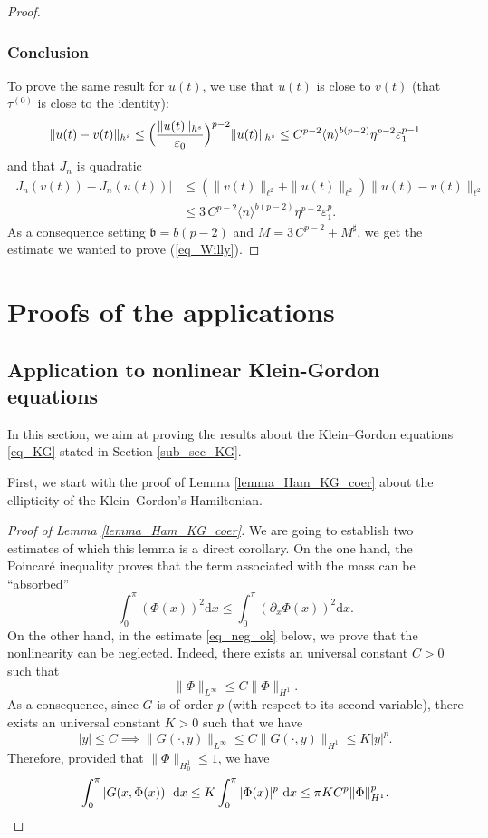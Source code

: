 \documentclass[JEP,XML,SOM,Unicode,NoEqCountersInSection,published]{cedram}
\theoremstyle{definition}
\begin{document}
\begin{proof}
\subsubsection*{Conclusion}
To prove the same result for $u(t)$, we use that $u(t)$ is close to $v(t)$ (\ie that $\tau^{(0)}$ is close to the identity):
\[
\| u(t) - v(t) \|_{h^s} \leq \Bigl(\frac{\|u(t) \|_{h^s}}{\varepsilon_0} \Bigr)^{p-2} \| u(t) \|_{h^s} \leq C^{p-2} \langle n \rangle^{b(p-2)} \eta^{p-2} \varepsilon_1^{p-1}
\]
and that $J_n$ is quadratic
\begin{equation*}
\begin{split}
| J_n(v(t)) - J_n(u(t)) | &\leq (\| v(t) \|_{\ell^2} + \| u(t) \|_{\ell^2}) \| u(t) -v(t)\|_{\ell^2} \\
&\leq 3 \, C^{p-2} \langle n \rangle^{b(p-2)} \eta^{p-2} \varepsilon_1^{p}.
\end{split}
\end{equation*}
As a consequence setting $\mathfrak{b} = b(p-2)$ and $M = 3 \, C^{p-2} + M^\sharp$, we get the estimate we wanted to prove (\ie \eqref{eq_Willy}).
\end{proof}

\section{Proofs of the applications}
\label{sec_proofs}

\subsection{Application to nonlinear Klein-Gordon equations}
\label{sec_KG}
In this section, we aim at proving the results about the Klein--Gordon equations \eqref{eq_KG} stated in Section \ref{sub_sec_KG}.

First, we start with the proof of Lemma \ref{lemma_Ham_KG_coer} about the ellipticity of the Klein--Gordon's Hamiltonian.
\begin{proof}[Proof of Lemma \ref{lemma_Ham_KG_coer}] We are going to establish two estimates of which this lemma is a direct corollary. On the one hand, the Poincaré inequality proves that the term associated with the mass can be ``absorbed''
\[
\int_0^\pi (\Phi(x))^2 \mathrm{d}x \leq \int_0^\pi (\partial_x \Phi(x))^2 \mathrm{d}x.
\]
On the other hand, in the estimate \eqref{eq_neg_ok} below, we prove that the nonlinearity can be neglected. Indeed, there exists an universal constant $C>0$ such that
\[
\| \Phi \|_{L^\infty} \leq C \| \Phi \|_{H^1}.
\]
As a consequence, since $G$ is of order $p$ (with respect to its second variable), there exists an universal constant $K>0$ such that we have
\[
|y|\leq C \implies \|G(\cdot,y)\|_{L^\infty} \leq C\|G(\cdot,y)\|_{H^1} \leq K |y|^p.
\]
Therefore, provided that $\| \Phi \|_{H^1_0}\leq 1$, we have
\begin{equation}
\label{eq_neg_ok}
\int_0^\pi |G(x,\Phi(x))| \ \mathrm{d}x \leq K \int_0^\pi |\Phi(x)|^p \ \mathrm{d}x \leq \pi K C^p \| \Phi \|_{H^1}^p.\qedhere
\end{equation}
\end{proof}
\end{document}
